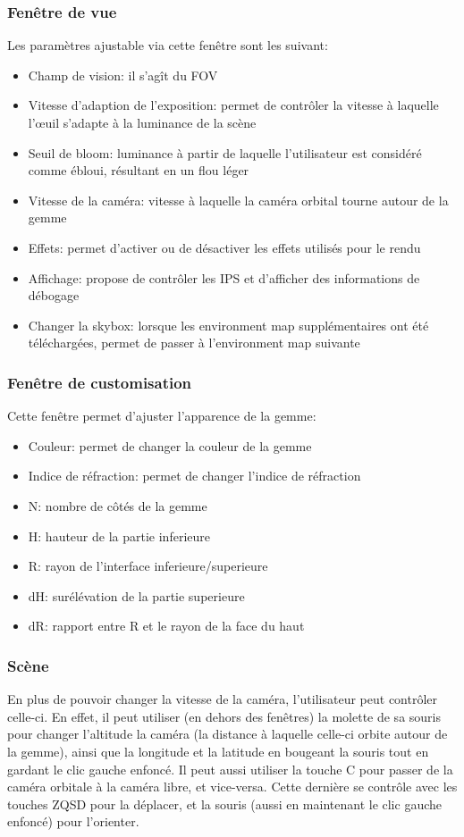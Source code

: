 \documentclass[a4paper,12pt]{article}
\begin{document}
\subsubsection{Fenêtre de vue}
Les paramètres ajustable via cette fenêtre sont les suivant:
\begin{itemize}
    \item Champ de vision: il s'agît du FOV
    \item Vitesse d'adaption de l'exposition: permet de contrôler la vitesse à laquelle l'œuil s'adapte à la luminance de la scène
    \item Seuil de bloom: luminance à partir de laquelle l'utilisateur est considéré comme ébloui, résultant en un flou léger
    \item Vitesse de la caméra: vitesse à laquelle la caméra orbital tourne autour de la gemme
    \item Effets: permet d'activer ou de désactiver les effets utilisés pour le rendu
    \item Affichage: propose de contrôler les IPS et d'afficher des informations de débogage
    \item Changer la skybox: lorsque les environment map supplémentaires ont été téléchargées, permet de passer à l'environment map suivante
\end{itemize}

\subsubsection{Fenêtre de customisation}
Cette fenêtre permet d'ajuster l'apparence de la gemme:
\begin{itemize}
    \item Couleur: permet de changer la couleur de la gemme
    \item Indice de réfraction: permet de changer l'indice de réfraction
    \item N: nombre de côtés de la gemme
    \item H: hauteur de la partie inferieure
    \item R: rayon de l'interface inferieure/superieure
    \item dH: surélévation de la partie superieure
    \item dR: rapport entre R et le rayon de la face du haut
\end{itemize}

\subsubsection{Scène}
En plus de pouvoir changer la vitesse de la caméra, l'utilisateur peut contrôler celle-ci. En effet,
il peut utiliser (en dehors des fenêtres) la molette de sa souris pour changer l'altitude la caméra
(la distance à laquelle celle-ci orbite autour de la gemme), ainsi que la longitude et la latitude
en bougeant la souris tout en gardant le clic gauche enfoncé. Il peut aussi utiliser la touche C pour
passer de la caméra orbitale à la caméra libre, et vice-versa. Cette dernière se contrôle avec les
touches ZQSD pour la déplacer, et la souris (aussi en maintenant le clic gauche enfoncé)
pour l'orienter.
\end{document}
